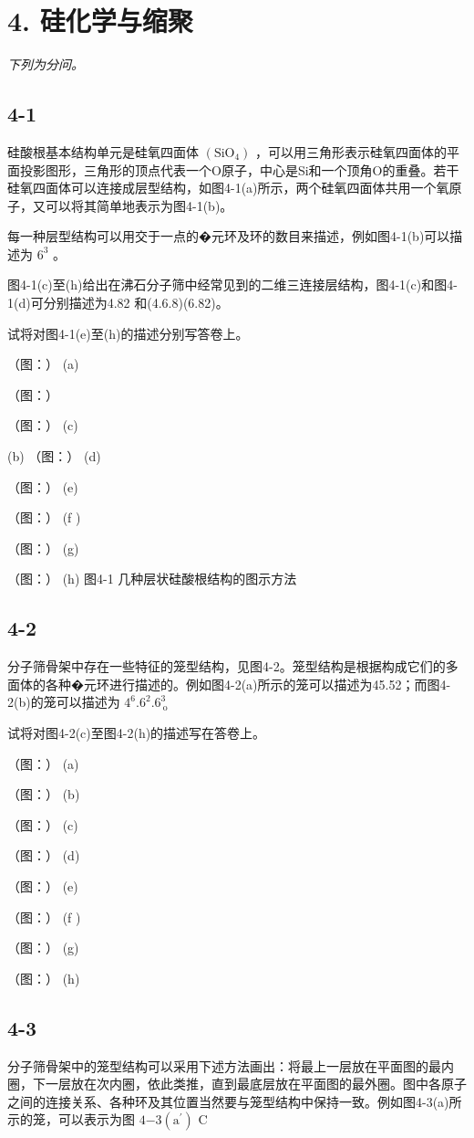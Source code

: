 \section*{4. 硅化学与缩聚}
\textit{下列为分问。}

\subsection*{4-1}
硅酸根基本结构单元是硅氧四⾯体 $\mathrm { ( S i O _ { 4 } ) }$ ，可以⽤三⻆形表⽰硅氧四⾯体的平⾯投影图形，三⻆形的顶点代表⼀个O原⼦，中⼼是Si和⼀个顶⻆O的重叠。若⼲硅氧四⾯体可以连接成层型结构，如图4-1(a)所⽰，两个硅氧四⾯体共⽤⼀个氧原⼦，⼜可以将其简单地表⽰为图4-1(b)。

每⼀种层型结构可以⽤交于⼀点的�元环及环的数⽬来描述，例如图4-1(b)可以描述为 $6 ^ { 3 }$ 。

图4-1(c)⾄(h)给出在沸⽯分⼦筛中经常⻅到的⼆维三连接层结构，图4-1(c)和图4-1(d)可分别描述为4.82 和(4.6.8)(6.82)。

试将对图4-1(e)⾄(h)的描述分别写答卷上。

（图：）
(a)

（图：）

（图：）
(c)

(b)
（图：）
(d)

（图：）
(e)

（图：）
(f )

（图：）
(g)

（图：）
(h)
图4-1 ⼏种层状硅酸根结构的图⽰⽅法

\subsection*{4-2}
分⼦筛⻣架中存在⼀些特征的笼型结构，⻅图4-2。笼型结构是根据构成它们的多⾯体的各种�元环进⾏描述的。例如图4-2(a)所⽰的笼可以描述为45.52；⽽图4-2(b)的笼可以描述为 $4 ^ { 6 } . 6 ^ { 2 } . 6 _ { \mathrm { ~ o ~ } } ^ { 3 }$

试将对图4-2(c)⾄图4-2(h)的描述写在答卷上。

（图：）
(a)

（图：）
(b)

（图：）
(c)

（图：）
(d)

（图：）
(e)

（图：）
(f )

（图：）
(g)

（图：）
(h)

\subsection*{4-3}
分⼦筛⻣架中的笼型结构可以采⽤下述⽅法画出：将最上⼀层放在平⾯图的最内圈，下⼀层放在次内圈，依此类推，直到最底层放在平⾯图的最外圈。图中各原⼦之间的连接关系、各种环及其位置当然要与笼型结构中保持⼀致。例如图4-3(a)所⽰的笼，可以表⽰为图 $4 \mathrm { - } 3 ( \mathrm { a } ^ { \prime } )$ C

